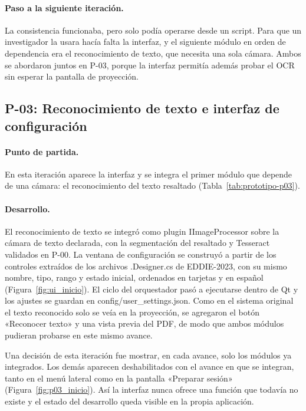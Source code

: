 \paragraph{Paso a la siguiente iteración.} La consistencia funcionaba, pero solo podía operarse desde un script. Para que un investigador la usara hacía falta la interfaz, y el siguiente módulo en orden de dependencia era el reconocimiento de texto, que necesita una sola cámara. Ambos se abordaron juntos en P-03, porque la interfaz permitía además probar el OCR sin esperar la pantalla de proyección.

\subsection{P-03: Reconocimiento de texto e interfaz de configuración}
\label{sec:it_p03}

\paragraph{Punto de partida.} En esta iteración aparece la interfaz y se integra el primer módulo que depende de una cámara: el reconocimiento del texto resaltado (Tabla~\ref{tab:prototipo-p03}).



\paragraph{Desarrollo.} El reconocimiento de texto se integró como plugin IImageProcessor sobre la cámara de texto declarada, con la segmentación del resaltado y Tesseract validados en P-00. La ventana de configuración se construyó a partir de los controles extraídos de los archivos .Designer.cs de EDDIE-2023, con su mismo nombre, tipo, rango y estado inicial, ordenados en tarjetas y en español (Figura~\ref{fig:ui_inicio}). El ciclo del orquestador pasó a ejecutarse dentro de Qt y los ajustes se guardan en config/user\_settings.json. Como en el sistema original el texto reconocido solo se veía en la proyección, se agregaron el botón «Reconocer texto» y una vista previa del PDF, de modo que ambos módulos pudieran probarse en este mismo avance.

Una decisión de esta iteración fue mostrar, en cada avance, solo los módulos ya integrados. Los demás aparecen deshabilitados con el avance en que se integran, tanto en el menú lateral como en la pantalla «Preparar sesión» (Figura~\ref{fig:p03_inicio}). Así la interfaz nunca ofrece una función que todavía no existe y el estado del desarrollo queda visible en la propia aplicación.

